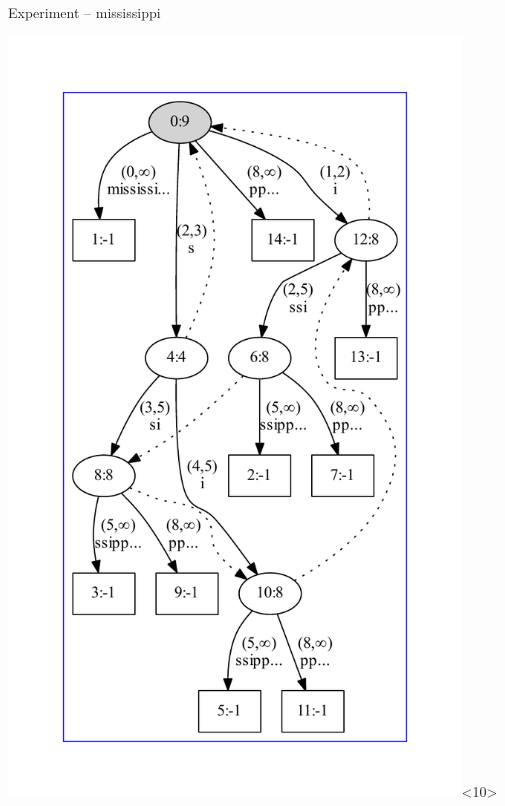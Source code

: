 \begin{frame}{Experiment -- mississippi}
\begin{overlayarea}{\textwidth}{\textheight}
\includegraphics[keepaspectratio,height=0.9\textheight,width=0.9\textwidth]{mississipp.pdf}<10>

\end{overlayarea}
\end{frame}
